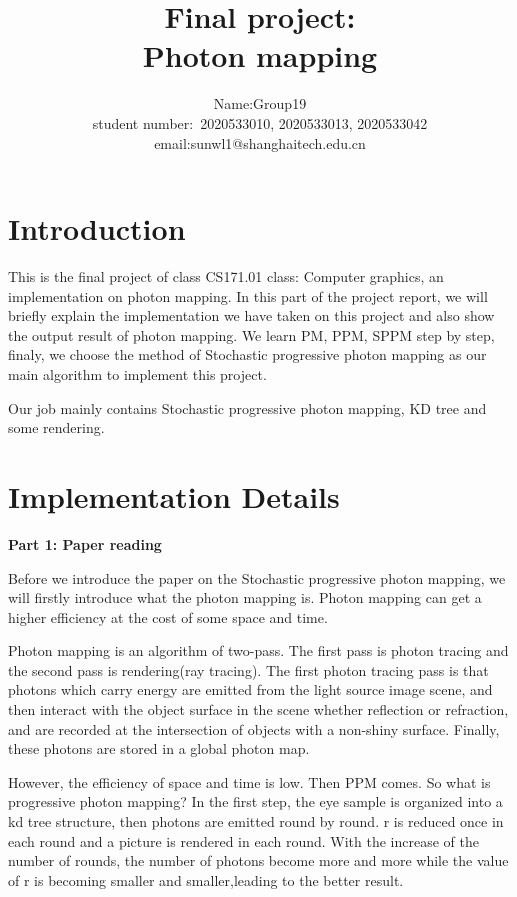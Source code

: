 \documentclass[acmtog]{acmart}
\title{Final project:\\ {Photon mapping}}
\author{Name:\quad Group19  \\ student number:\ 2020533010, 2020533013, 2020533042
\\email:\quad sunwl1@shanghaitech.edu.cn}
\begin{document}
\maketitle

\vspace*{2 ex}

\section{Introduction} 

\quad This is the final project of class CS171.01 class: Computer graphics, an implementation on photon mapping. 
In this part of the project report, we will briefly explain the implementation we have taken on this project
and also show the output result of photon mapping. We learn PM, PPM, SPPM step by step, finaly, we choose the method of Stochastic progressive photon mapping
as our main algorithm to implement this project.

Our job mainly contains Stochastic progressive photon mapping, KD tree and some rendering. 

\section{Implementation Details}

\quad \textbf{Part 1: Paper reading}

Before we introduce the paper on the Stochastic progressive photon mapping, we will firstly introduce what the photon mapping is. Photon mapping can get a higher efficiency at the cost of some space and time.

Photon mapping is an algorithm of two-pass. The first pass is photon tracing and the second pass is rendering(ray tracing). The first photon tracing pass is that photons which carry energy are emitted from the light source image scene, and then interact with the object surface in the scene whether reflection or refraction, and are recorded at the intersection of objects with a non-shiny surface. Finally, these photons are stored in a global photon map.

However, the efficiency of space and time is low. Then PPM comes. So what is progressive photon mapping? In the first step, the eye sample is organized into a kd tree structure, then photons are emitted round by round. r is reduced once in each round and a picture is rendered in each round. With the increase of the number of rounds, the number of photons become more and more while the value of r is becoming smaller and smaller,leading to the better result.
\end{document}
